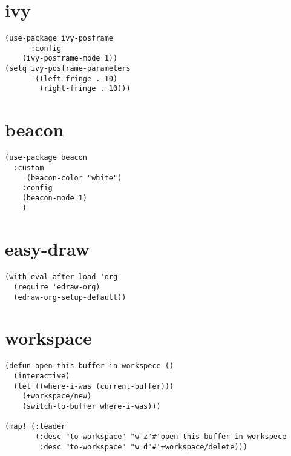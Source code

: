 \documentclass[11pt]{article}
\begin{document}
\section{ivy}
\label{sec:org3f25cba}
\begin{verbatim}
(use-package ivy-posframe
      :config
    (ivy-posframe-mode 1))
(setq ivy-posframe-parameters
      '((left-fringe . 10)
        (right-fringe . 10)))
\end{verbatim}
\section{beacon}
\label{sec:org350a73a}
\begin{verbatim}
(use-package beacon
  :custom
     (beacon-color "white")
    :config
    (beacon-mode 1)
    )
\end{verbatim}
\section{easy-draw}
\label{sec:orgf6dc90b}
\begin{verbatim}
(with-eval-after-load 'org
  (require 'edraw-org)
  (edraw-org-setup-default))
\end{verbatim}
\section{workspace}
\label{sec:org8fdbe91}
\begin{verbatim}
(defun open-this-buffer-in-workspece ()
  (interactive)
  (let ((where-i-was (current-buffer)))
    (+workspace/new)
    (switch-to-buffer where-i-was)))

(map! (:leader
       (:desc "to-workspace" "w z"#'open-this-buffer-in-workspece
        :desc "to-workspace" "w d"#'+workspace/delete)))
\end{verbatim}
\end{document}
